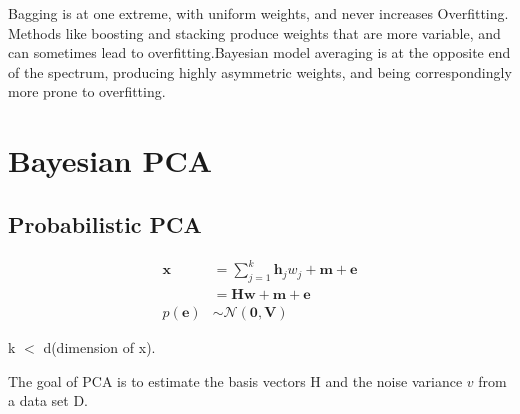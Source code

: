 \documentclass{article}
\begin{document}
Bagging is at one extreme, with uniform weights, and never increases Overﬁtting. Methods like boosting and stacking produce weights that are more variable, and can sometimes lead to overﬁtting.Bayesian model averaging is at the opposite end of the spectrum, producing highly asymmetric weights, and being correspondingly more prone to overﬁtting.

\section{Bayesian PCA\cite{minka__AutomaticChoiceDimensionality}}

\subsection{Probabilistic PCA}
\begin{equation}
    \begin{aligned}
    \mathbf{x} &=\sum_{j=1}^{k} \mathbf{h}_{j} w_{j}+\mathbf{m}+\mathbf{e} \\
    &=\mathbf{H} \mathbf{w}+\mathbf{m}+\mathbf{e} \\
    p(\mathbf{e}) & \sim \mathcal{N}(\mathbf{0}, \mathbf{V})
    \end{aligned}
\end{equation}

k $<$ d(dimension of x).

The goal of PCA is to estimate the basis vectors H and the noise variance $v$ from a data set D.





\appendix
\end{document}
